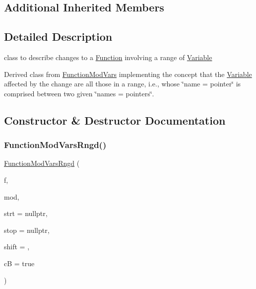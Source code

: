 \subsection*{Additional Inherited Members}


\subsection{Detailed Description}
class to describe changes to a \mbox{\hyperlink{class_s_m_spp__di__unipi__it_1_1_function}{Function}} involving a range of \mbox{\hyperlink{class_s_m_spp__di__unipi__it_1_1_variable}{Variable}} 

Derived class from \mbox{\hyperlink{class_s_m_spp__di__unipi__it_1_1_function_mod_vars}{Function\+Mod\+Vars}} implementing the concept that the \mbox{\hyperlink{class_s_m_spp__di__unipi__it_1_1_variable}{Variable}} affected by the change are all those in a range, i.\+e., whose \char`\"{}name = pointer\char`\"{} is comprised between two given \char`\"{}names = pointers\char`\"{}. 

\subsection{Constructor \& Destructor Documentation}
\mbox{\label{class_s_m_spp__di__unipi__it_1_1_function_mod_vars_rngd_a194ffc20c4f5b6649072d014b25f77b8}} 
\subsubsection{\texorpdfstring{Function\+Mod\+Vars\+Rngd()}{FunctionModVarsRngd()}}
{\footnotesize\ttfamily \mbox{\hyperlink{class_s_m_spp__di__unipi__it_1_1_function_mod_vars_rngd}{Function\+Mod\+Vars\+Rngd}} (\begin{DoxyParamCaption}\item[{\mbox{\hyperlink{class_s_m_spp__di__unipi__it_1_1_function}{Function}} $\ast$const}]{f,  }\item[{const int}]{mod,  }\item[{\mbox{\hyperlink{class_s_m_spp__di__unipi__it_1_1_variable}{Variable}} $\ast$const}]{strt = {\ttfamily nullptr},  }\item[{\mbox{\hyperlink{class_s_m_spp__di__unipi__it_1_1_variable}{Variable}} $\ast$const}]{stop = {\ttfamily nullptr},  }\item[{const \mbox{\hyperlink{class_s_m_spp__di__unipi__it_1_1_function_mod_a44f54e31f9fa8a29194218c234876284}{Function\+Value}}}]{shift = {},  }\item[{const bool}]{cB = {\ttfamily true} }\end{DoxyParamCaption})\hspace{0.3cm}{\ttfamily [inline]}}



